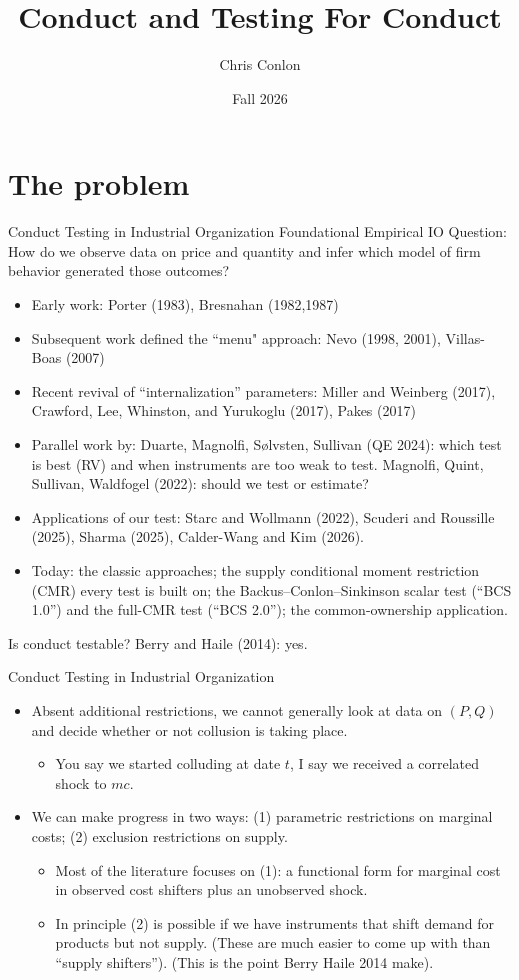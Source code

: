 \documentclass[aspectratio=169,10pt]{beamer}
\title{Conduct and Testing For Conduct}
\author{Chris Conlon}
\institute{Grad IO}
\date{Fall 2026}
\begin{document}
\frame{\titlepage}

\section{The problem}

\begin{frame}[plain]{Conduct Testing in Industrial Organization}
Foundational Empirical IO Question: How do we observe data on price and quantity and infer which model of firm behavior generated those outcomes?

\begin{itemize}
\item Early work: Porter (1983), Bresnahan (1982,1987)
\item Subsequent work defined the ``menu" approach: Nevo (1998, 2001), Villas-Boas (2007)
\item Recent revival of ``internalization'' parameters: Miller and Weinberg (2017), Crawford, Lee, Whinston, and Yurukoglu (2017), Pakes (2017)
\item Parallel work by: Duarte, Magnolfi, S\o lvsten, Sullivan (QE 2024): which test is best (RV) and when instruments are too weak to test. Magnolfi, Quint, Sullivan, Waldfogel (2022): should we test or estimate?
\item Applications of our test: Starc and Wollmann (2022), Scuderi and Roussille (2025), Sharma (2025), Calder-Wang and Kim (2026).
\item Today: the classic approaches; the supply conditional moment restriction (CMR) every test is built on; the Backus--Conlon--Sinkinson scalar test (``BCS 1.0'') and the full-CMR test (``BCS 2.0''); the common-ownership application.
\end{itemize}
Is conduct testable? Berry and Haile (2014): yes.
\end{frame}


\begin{frame}{Conduct Testing in Industrial Organization}
\begin{itemize}
\item Absent additional restrictions, we cannot generally look at data on $(P,Q)$ and decide whether or not collusion is taking place.
\begin{itemize}
\item You say we started colluding at date $t$, I say we received a correlated shock to $mc$.
\end{itemize}
\item We can make progress in two ways: (1) parametric restrictions on marginal costs; (2) exclusion restrictions on supply.
\begin{itemize}
\item Most of the literature focuses on (1): a functional form for marginal cost in observed cost shifters plus an unobserved shock.
\item In principle (2) is possible if we have instruments that shift demand for products but not supply. (These are much easier to come up with than ``supply shifters''). (This is the point Berry Haile 2014 make).
\end{itemize}
\end{itemize}
\end{frame}
\end{document}
